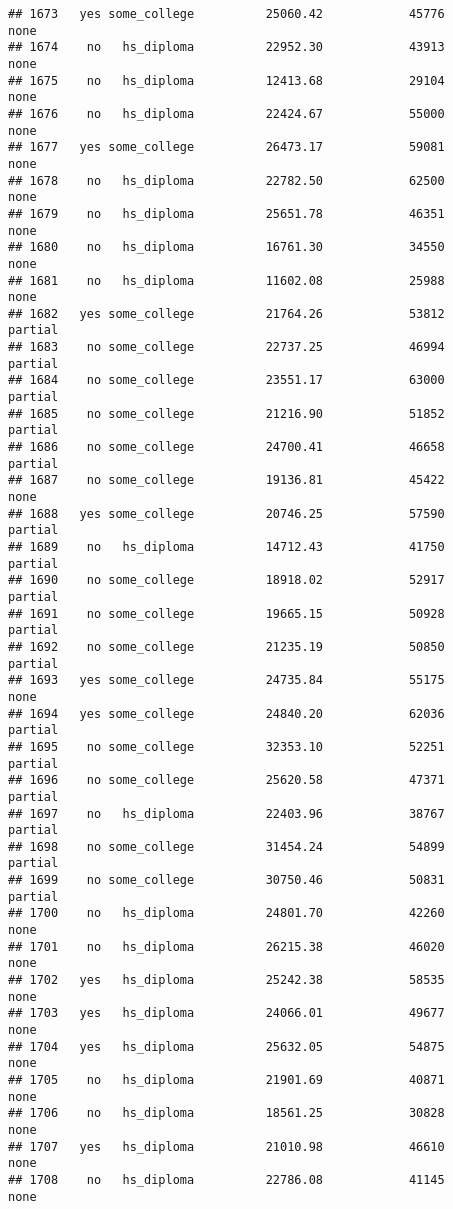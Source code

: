 \documentclass[
]{article}
\begin{document}
\begin{verbatim}
## 1673   yes some_college          25060.42            45776        none
## 1674    no   hs_diploma          22952.30            43913        none
## 1675    no   hs_diploma          12413.68            29104        none
## 1676    no   hs_diploma          22424.67            55000        none
## 1677   yes some_college          26473.17            59081        none
## 1678    no   hs_diploma          22782.50            62500        none
## 1679    no   hs_diploma          25651.78            46351        none
## 1680    no   hs_diploma          16761.30            34550        none
## 1681    no   hs_diploma          11602.08            25988        none
## 1682   yes some_college          21764.26            53812     partial
## 1683    no some_college          22737.25            46994     partial
## 1684    no some_college          23551.17            63000     partial
## 1685    no some_college          21216.90            51852     partial
## 1686    no some_college          24700.41            46658     partial
## 1687    no some_college          19136.81            45422        none
## 1688   yes some_college          20746.25            57590     partial
## 1689    no   hs_diploma          14712.43            41750     partial
## 1690    no some_college          18918.02            52917     partial
## 1691    no some_college          19665.15            50928     partial
## 1692    no some_college          21235.19            50850     partial
## 1693   yes some_college          24735.84            55175        none
## 1694   yes some_college          24840.20            62036     partial
## 1695    no some_college          32353.10            52251     partial
## 1696    no some_college          25620.58            47371     partial
## 1697    no   hs_diploma          22403.96            38767     partial
## 1698    no some_college          31454.24            54899     partial
## 1699    no some_college          30750.46            50831     partial
## 1700    no   hs_diploma          24801.70            42260        none
## 1701    no   hs_diploma          26215.38            46020        none
## 1702   yes   hs_diploma          25242.38            58535        none
## 1703   yes   hs_diploma          24066.01            49677        none
## 1704   yes   hs_diploma          25632.05            54875        none
## 1705    no   hs_diploma          21901.69            40871        none
## 1706    no   hs_diploma          18561.25            30828        none
## 1707   yes   hs_diploma          21010.98            46610        none
## 1708    no   hs_diploma          22786.08            41145        none

\end{verbatim}
\end{document}
